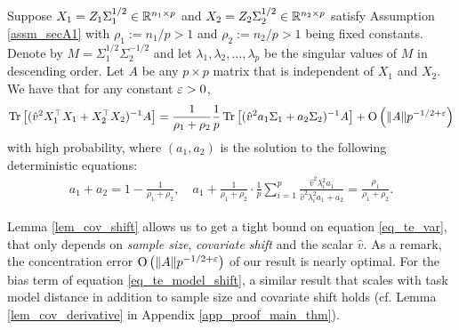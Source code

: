 \begin{lemma}\label{lem_cov_shift}
	Suppose $X_1=Z_1\Sigma_1^{1/2}\in \mathbb{R}^{n_1\times p}$ and $X_2=Z_2\Sigma_2^{1/2}\in \mathbb{R}^{n_2\times p}$ satisfy Assumption \ref{assm_secA1} with $\rho_1:=n_1/p>1$ and $\rho_2:=n_2/p>1$ being fixed constants.
	Denote by $M = \Sigma_1^{1/2}\Sigma_2^{-1/2}$ and let $\lambda_1, \lambda_2, \dots, \lambda_p$ be the singular values of $M$ in descending order. Let $A$ be any $p\times p$ matrix that is independent of $X_1$ and $X_2$. We have that for any constant ${\varepsilon}>0$,
	\begin{align}\label{lem_cov_shift_eq}
		\operatorname{Tr}\left[(\hat v^2 X_1^{\top}X_1 + X_2^{\top}X_2)^{-1}A\right] = \frac{1}{\rho_1+\rho_2}\frac1p\operatorname{Tr}\left[ (\hat v^2 a_1 \Sigma_1 + a_2\Sigma_2)^{-1} A\right] +\operatorname{O}\left(\|A\| p^{-1/2+\varepsilon}\right)
	\end{align}
with high probability, where $(a_1, a_2)$ is the solution to the following deterministic equations:
	\begin{align}
		a_1 + a_2 = 1- \frac{1}{\rho_1 + \rho_2},\quad a_1 + \frac1{\rho_1 + \rho_2}\cdot \frac{1}{p}\sum_{i=1}^p \frac{\hat v^2 \lambda_i^2 a_1}{\hat v^2 \lambda_i^2 a_1 + a_2} = \frac{\rho_1}{\rho_1 + \rho_2}. \label{eq_a12extra}
	\end{align}
\end{lemma}


Lemma \ref{lem_cov_shift} allows us to get a tight bound on equation \eqref{eq_te_var}, that only depends on \textit{sample size}, \textit{covariate shift} and the scalar $\hat{v}$.
As a remark, the concentration error $\operatorname{O}\left(\|A\| p^{-1/2+\varepsilon}\right)$ of our result is nearly optimal.
For the bias term of equation \eqref{eq_te_model_shift}, a similar result that scales with task model distance in addition to sample size and covariate shift holds (cf. Lemma \ref{lem_cov_derivative} in Appendix \ref{app_proof_main_thm}).

